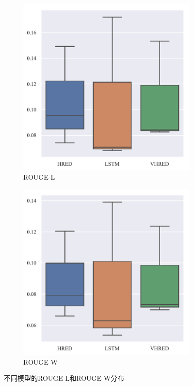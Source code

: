 \begin{figure}[H]
    \begin{subfigure}{0.5\linewidth}
        \centering
        \includegraphics[width=\linewidth]{figure/boxplot/model/rouge_l/plot.pdf}
        \caption{ROUGE-L}
    \end{subfigure}%
    \begin{subfigure}{0.5\linewidth}
        \centering
        \includegraphics[width=\linewidth]{figure/boxplot/model/rouge_w/plot.pdf}
        \caption{ROUGE-W}
    \end{subfigure}
    \centering
    \caption{不同模型的ROUGE-L和ROUGE-W分布}
    \label{fig:ROUGE_LW_model}
\end{figure}
